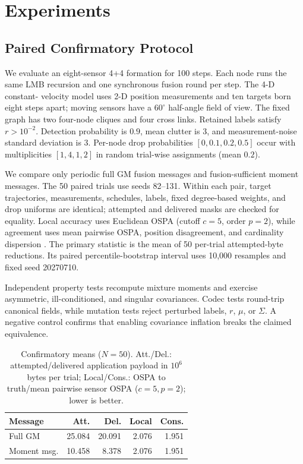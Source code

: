 \section{Experiments}
\label{sec:experiments}

\subsection{Paired Confirmatory Protocol}

We evaluate an eight-sensor 4+4 formation for 100 steps. Each node runs the same
LMB recursion and one synchronous fusion round per step. The 4-D constant-
velocity model uses 2-D position measurements and ten targets born eight steps
apart; moving sensors have a $60^\circ$ half-angle field of view. The fixed graph
has two four-node cliques and four cross links. Retained labels satisfy
$r>10^{-2}$. Detection probability is $0.9$, mean clutter is $3$, and
measurement-noise standard deviation is $3$. Per-node drop probabilities
$[0,0.1,0.2,0.5]$ occur with multiplicities $[1,4,1,2]$ in random trial-wise
assignments (mean $0.2$).

We compare only periodic full GM fusion messages and fusion-sufficient moment
messages. The 50 paired trials use seeds 82--131. Within each pair, target
trajectories, measurements, schedules, labels, fixed degree-based weights, and drop
uniforms are identical; attempted and delivered masks are checked for equality.
Local accuracy uses Euclidean OSPA (cutoff $c=5$, order $p=2$), while agreement
uses mean pairwise OSPA, position disagreement, and cardinality dispersion
\cite{Schuhmacher2008OSPA}. The primary statistic is the mean of 50 per-trial
attempted-byte reductions. Its paired percentile-bootstrap interval uses 10,000
resamples and fixed seed 20270710.

Independent property tests recompute mixture moments and
exercise asymmetric, ill-conditioned, and singular covariances. Codec tests
round-trip canonical fields, while mutation tests reject perturbed labels,
$r$, $\mu$, or $\Sigma$. A negative control confirms that enabling covariance
inflation breaks the claimed equivalence.

\begin{table}[H]
    \centering
    \caption{Confirmatory means ($N=50$). Att./Del.: attempted/delivered application payload in $10^6$ bytes per trial; Local/Cons.: OSPA to truth/mean pairwise sensor OSPA ($c=5,p=2$); lower is better.}
    \label{tab:confirmatory-results}
    \begin{tabular}{lrrrr}
        \toprule
        Message & Att. & Del. & Local & Cons. \\
        \midrule
        Full GM & 25.084 & 20.091 & 2.076 & 1.951 \\
        Moment msg. & 10.458 & 8.378 & 2.076 & 1.951 \\
        \bottomrule
    \end{tabular}
\end{table}

